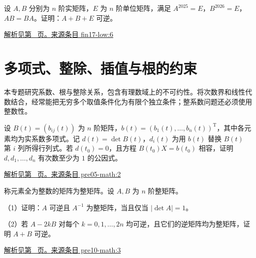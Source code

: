 \documentclass[12pt,fontset=fandol]{ctexart}
\begin{document}
\begin{example}\label{ex:fin17-low:6}

设 $A,B$ 分别为 $n$ 阶实矩阵，$E$ 为 $n$ 阶单位矩阵，满足 $A^{2025}=E$，$B^{2026}=E$，$AB=BA$。证明：$A+B+E$ 可逆。

\par\hyperref[ans:fin17-low:6]{解析见第~\pageref{ans:fin17-low:6} 页。}\quad\href{https://github.com/lzxcr/cmc-mathematics/blob/64916fa1fdbc3e444a652eca204d5669058ee321/src/problems/finals/17/08.md}{来源条目 fin17-low:6}

\end{example}

\section{多项式、整除、插值与根的约束}

\label{sec:questions-4}

本专题研究系数、根与整除关系，包含有理数域上的不可约性。将次数界和线性代数结合，经常能把无穷多个取值条件化为有限个独立条件；整系数问题还必须使用整数性。

\begin{example}\label{ex:pre05-math:2}

设 $B(t)=(b_{ij}(t))$ 为 $n$ 阶矩阵，$b(t)=(b_1(t),\ldots,b_n(t))^{\mathrm T}$，其中各元素均为实系数多项式。记 $d(t)=\det B(t)$，$d_i(t)$ 为用 $b(t)$ 替换 $B(t)$ 第 $i$ 列所得行列式。若 $d(t_0)=0$，且方程 $B(t_0)X=b(t_0)$ 相容，证明 $d,d_1,\ldots,d_n$ 有次数至少为 $1$ 的公因式。

\par\hyperref[ans:pre05-math:2]{解析见第~\pageref{ans:pre05-math:2} 页。}\quad\href{https://github.com/lzxcr/cmc-mathematics/blob/64916fa1fdbc3e444a652eca204d5669058ee321/src/problems/preliminary/05/02.md}{来源条目 pre05-math:2}

\end{example}

\begin{example}\label{ex:pre10-math:3}

称元素全为整数的矩阵为整矩阵。设 $A,B$ 为 $n$ 阶整矩阵。

（1）证明：$A$ 可逆且 $A^{-1}$ 为整矩阵，当且仅当 $|\det A|=1$。

（2）若 $A-2kB$ 对每个 $k=0,1,\ldots,2n$ 均可逆，且它们的逆矩阵均为整矩阵，证明 $A+B$ 可逆。

\par\hyperref[ans:pre10-math:3]{解析见第~\pageref{ans:pre10-math:3} 页。}\quad\href{https://github.com/lzxcr/cmc-mathematics/blob/64916fa1fdbc3e444a652eca204d5669058ee321/src/problems/preliminary/10/03.md}{来源条目 pre10-math:3}

\end{example}
\end{document}
